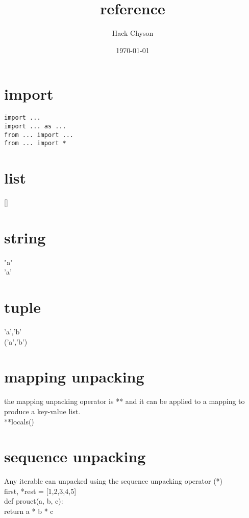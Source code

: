 \documentclass[11pt]{article}
\author{Hack Chyson}
\date{\today}
\title{reference}
\begin{document}
\maketitle
\tableofcontents

\section{import}
\label{sec-1}
\begin{verbatim}
import ...
import ... as ...
from ... import ...
from ... import *
\end{verbatim}
\section{list}
\label{sec-2}
[] \\

\section{string}
\label{sec-3}
"a" \\
'a' \\

\section{tuple}
\label{sec-4}
'a','b' \\
('a','b') \\

\section{mapping unpacking}
\label{sec-5}
the mapping unpacking operator is ** and it can be applied to a mapping to produce a key-value list. \\
**locals() \\


\section{sequence unpacking}
\label{sec-6}
Any iterable can unpacked using the sequence unpacking operator (*) \\

first, *rest = [1,2,3,4,5] \\

def prouct(a, b, c): \\
    return a * b * c \\
\end{document}
